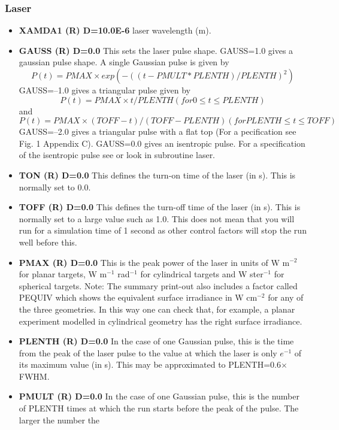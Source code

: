 \subsubsection{\bf  Laser}
\begin{itemize}
\item {\bf XAMDA1 (R) D=10.0E-6}
laser wavelength (m).
\item {\bf GAUSS (R) D=0.0}
This sets the laser pulse shape. 
\newline GAUSS=1.0
gives a gaussian pulse shape. A single Gaussian pulse is given  
by 
$$P(t)=PMAX\times exp(-((t-PMULT*PLENTH)/PLENTH)^2)$$
\newline GAUSS=--1.0 gives a triangular pulse given by 
$$P(t)=PMAX\times t/PLENTH (for 0 \leq t \leq PLENTH)$$
and 
$$P(t)=PMAX\times (TOFF-t)/(TOFF-PLENTH) (for PLENTH \leq t \leq TOFF)$$  
\newline GAUSS=--2.0 gives a triangular pulse with a flat top (For a pecification see Fig. 1 Appendix C). 
\newline GAUSS=0.0 gives an isentropic pulse.
For a specification of the
isentropic pulse see \cite{cpc} or look in subroutine laser.
\item {\bf TON (R) D=0.0}
This defines the turn-on time of the laser (in s).
This is normally set to 0.0. 
\item {\bf TOFF (R) D=0.0}
This defines the turn-off time of the laser (in s).
This is normally set to a large value such as 1.0. This does not
mean that you will run for a simulation time of 1 second as other
control factors will stop the run well before this.
\item {\bf PMAX (R) D=0.0}
This is the peak power of the laser in units
of W m$^{-2}$ for planar targets, W m$^{-1}$ rad$^{-1}$ for cylindrical
targets and W ster$^{-1}$ for spherical targets. Note: The summary print-out
also includes a factor called PEQUIV which shows the equivalent
surface irradiance in W cm$^{-2}$ for any of the three geometries.
In this way one can check that, for example, a planar experiment
modelled in cylindrical geometry has the right surface irradiance.
\item {\bf PLENTH (R) D=0.0} In the case of one Gaussian pulse,
this is the time from the peak of the laser
pulse to the value at which the laser is only $e^{-1}$ of its maximum
value (in s). This may be approximated to PLENTH=0.6$\times$FWHM.
\item {\bf PMULT (R) D=0.0} In the case of one Gaussian pulse,
this is the number of PLENTH times at which
the run starts before the peak of the pulse. The larger the number the

\end{itemize}
